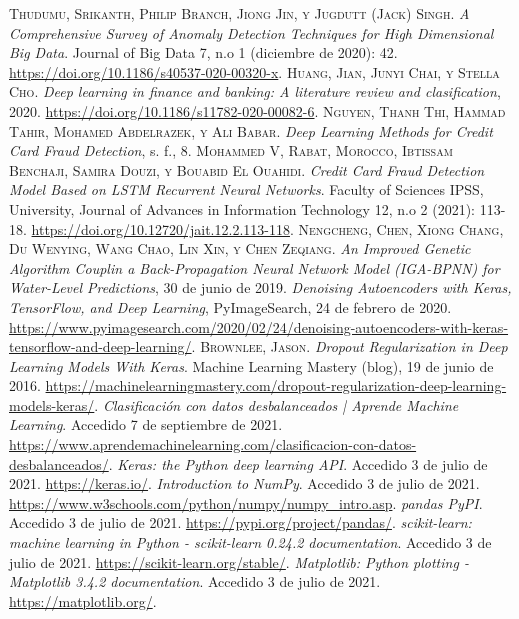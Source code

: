 \begin{thebibliography}{a}
	 \textsc{Thudumu, Srikanth, Philip Branch, Jiong Jin, y Jugdutt (Jack) Singh}. \textit{A Comprehensive Survey of Anomaly Detection Techniques for High Dimensional Big Data}. Journal of Big Data 7, n.o 1 (diciembre de 2020): 42. \url{https://doi.org/10.1186/s40537-020-00320-x}.
	 \textsc{Huang, Jian, Junyi Chai, y Stella Cho}. \textit{Deep learning in finance and banking: A literature review and clasification}, 2020. \url{https://doi.org/10.1186/s11782-020-00082-6}.
	 \textsc{Nguyen, Thanh Thi, Hammad Tahir, Mohamed Abdelrazek, y Ali Babar}. \textit{Deep Learning Methods for Credit Card Fraud Detection}, s. f., 8.
	 \textsc{Mohammed V, Rabat, Morocco, Ibtissam Benchaji, Samira Douzi, y Bouabid El Ouahidi}. \textit{Credit Card Fraud Detection Model Based on LSTM Recurrent Neural Networks}. Faculty of Sciences IPSS, University, Journal of Advances in Information Technology 12, n.o 2 (2021): 113-18. \url{https://doi.org/10.12720/jait.12.2.113-118}.
	 \textsc{Nengcheng, Chen, Xiong Chang, Du Wenying, Wang Chao, Lin Xin, y Chen Zeqiang}. \textit{An Improved Genetic Algorithm Couplin a Back-Propagation Neural Network Model (IGA-BPNN) for Water-Level Predictions}, 30 de junio de 2019.
	 \textit{Denoising Autoencoders with Keras, TensorFlow, and Deep Learning}, PyImageSearch, 24 de febrero de 2020. \url{https://www.pyimagesearch.com/2020/02/24/denoising-autoencoders-with-keras-tensorflow-and-deep-learning/}.
	 \textsc{Brownlee, Jason}. \textit{Dropout Regularization in Deep Learning Models With Keras}. Machine Learning Mastery (blog), 19 de junio de 2016. \url{https://machinelearningmastery.com/dropout-regularization-deep-learning-models-keras/}.
	 \textit{Clasificaci\'{o}n con datos desbalanceados | Aprende Machine Learning}. Accedido 7 de septiembre de 2021. \url{https://www.aprendemachinelearning.com/clasificacion-con-datos-desbalanceados/}.
	 \textit{Keras: the Python deep learning API}. Accedido 3 de julio de 2021. \url{https://keras.io/}.
	 \textit{Introduction to NumPy}. Accedido 3 de julio de 2021. \url{https://www.w3schools.com/python/numpy/numpy_intro.asp}.
	 \textit{pandas PyPI}. Accedido 3 de julio de 2021. \url{https://pypi.org/project/pandas/}.
	 \textit{scikit-learn: machine learning in Python - scikit-learn 0.24.2 documentation}. Accedido 3 de julio de 2021. \url{https://scikit-learn.org/stable/}.
	 \textit{Matplotlib: Python plotting - Matplotlib 3.4.2 documentation}. Accedido 3 de julio de 2021. \url{https://matplotlib.org/}.

\end{thebibliography}
